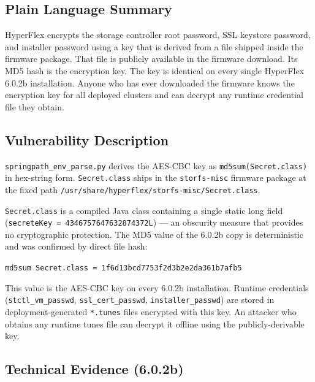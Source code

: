 \documentclass[11pt,a4paper]{article}
\begin{document}
\subsection*{Plain Language Summary}

HyperFlex encrypts the storage controller root password, SSL keystore password,
and installer password using a key that is derived from a file shipped inside the
firmware package. That file is publicly available in the firmware download. Its
MD5 hash is the encryption key. The key is identical on every single HyperFlex
6.0.2b installation. Anyone who has ever downloaded the firmware knows the
encryption key for all deployed clusters and can decrypt any runtime credential
file they obtain.

\subsection*{Vulnerability Description}

\texttt{springpath\_env\_parse.py} derives the AES-CBC key as
\texttt{md5sum(Secret.class)} in hex-string form. \texttt{Secret.class}
ships in the \texttt{storfs-misc} firmware package at the fixed path
\texttt{/usr/share/hyperflex/storfs-misc/Secret.class}.

\texttt{Secret.class} is a compiled Java class containing a single static long
field (\texttt{secreteKey = 4346757647632874372L}) --- an obscurity measure that
provides no cryptographic protection. The MD5 value of the 6.0.2b copy is
deterministic and was confirmed by direct file hash:

\medskip
\begin{center}
\texttt{md5sum Secret.class = 1f6d13bcd7753f2d3b2e2da361b7afb5}
\end{center}
\medskip

This value is the AES-CBC key on every 6.0.2b installation. Runtime credentials
(\texttt{stctl\_vm\_passwd}, \texttt{ssl\_cert\_passwd},
\texttt{installer\_passwd}) are stored in deployment-generated
\texttt{*.tunes} files encrypted with this key. An attacker who obtains any
runtime tunes file can decrypt it offline using the publicly-derivable key.

\subsection*{Technical Evidence (6.0.2b)}
\end{document}
